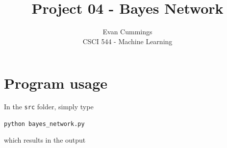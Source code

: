 
\DeclareMathOperator*{\argmax}{arg\,max}

\usepackage[top=1in, bottom=1in, left=.75in, right=.75in]{geometry}
\usepackage{framed}
\setlength{\columnsep}{8mm}


\small
\twocolumn

\title{Project 04 - Bayes Network}
\author{Evan Cummings\\
CSCI 544 - Machine Learning}

\maketitle

\section{Program usage}

In the \texttt{src} folder, simply type

\centerline{\texttt{python bayes\_network.py}}

\noindent which results in the output

